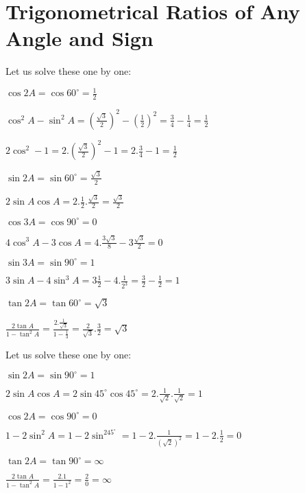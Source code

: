\chapter{Trigonometrical Ratios of Any Angle and Sign}
\startitemize[n, 1*broad]
\item Let us solve these one by one:
  \startitemize[i, 1*broad]
  \item $\cos 2A = \cos 60^\circ = \frac{1}{2}$

    $\cos^2A - \sin^2A = \left(\frac{\sqrt{3}}{2}\right)^2 - \left(\frac{1}{2}\right)^2 = \frac{3}{4} - \frac{1}{4} =
    \frac{1}{2}$

    $2\cos^2 - 1 = 2.\left(\frac{\sqrt{3}}{2}\right)^2 - 1 = 2.\frac{3}{4} - 1 = \frac{1}{2}$

  \item $\sin 2A = \sin 60^\circ = \frac{\sqrt{3}}{2}$

    $2\sin A\cos A = 2.\frac{1}{2}.\frac{\sqrt{3}}{2} = \frac{\sqrt{3}}{2}$

  \item $\cos 3A = \cos 90^\circ = 0$

    $4\cos^3A - 3\cos A = 4.\frac{3\sqrt{3}}{8} - 3\frac{\sqrt{3}}{2} = 0$

  \item $\sin 3A = \sin 90^\circ = 1$

    $3\sin A - 4\sin^3 A = 3\frac{1}{2} - 4. \frac{1}{2^3} = \frac{3}{2} - \frac{1}{2} = 1$

  \item $\tan 2A = \tan 60^\circ = \sqrt{3}$

    $\frac{2\tan A}{1 - \tan^2A} = \frac{2.\frac{1}{\sqrt{3}}}{1 - \frac{1}{3}} = \frac{2}{\sqrt{3}}.\frac{3}{2} =
    \sqrt{3}$
  \stopitemize
\item Let us solve these one by one:
  \startitemize[i, 1*broad]
  \item $\sin 2A = \sin 90^\circ = 1$

    $2\sin A\cos A = 2\sin 45^\circ\cos 45^\circ = 2.\frac{1}{\sqrt{2}}.\frac{1}{\sqrt{2}} = 1$

  \item $\cos 2A = \cos 90^\circ = 0$

    $1 - 2\sin^2A = 1 - 2\sin^245^\circ = 1 - 2.\frac{1}{(\sqrt{2})^2} = 1 - 2.\frac{1}{2} = 0$

  \item $\tan 2A = \tan 90^\circ = \infty$

    $\frac{2\tan A}{1 - \tan^2A} = \frac{2.1}{1 - 1^2} = \frac{2}{0} = \infty$
  \stopitemize

